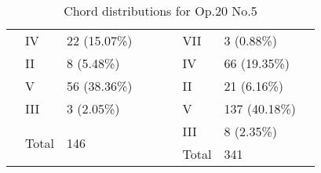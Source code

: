 \begin{table}[]
{\begin{tabular}{|l|l|l|l|l|l|l|l|l|}
 & IV & 22 (15.07\%) &  &  &  & VII & 3 (0.88\%) &  \\ \cline{2-3} \cline{7-8}
 & II & 8 (5.48\%) &  &  &  & IV & 66 (19.35\%) &  \\ \cline{2-3} \cline{7-8}
 & V & 56 (38.36\%) &  &  &  & II & 21 (6.16\%) &  \\ \cline{2-3} \cline{7-8}
 & III & 3 (2.05\%) &  &  &  & V & 137 (40.18\%) &  \\ \cline{2-3} \cline{7-8}
 & \multirow{2}{*}{Total} & \multirow{2}{*}{146} &  &  &  & III & 8 (2.35\%) &  \\ \cline{7-8}
 &  &  &  &  &  & Total & 341 &  \\ \cline{1-4} \cline{6-9}
\end{tabular}
}
\caption{Chord distributions for Op.20 No.5}
\label{table:chords_op20n5}
\end{table}

